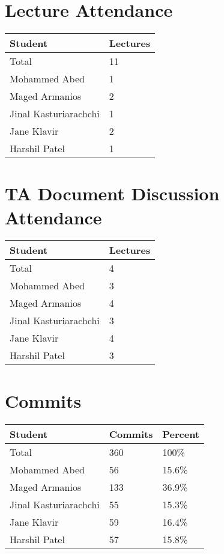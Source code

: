 \documentclass{article}
\begin{document}
\section{Lecture Attendance}

\begin{table}[H]
\centering
\begin{tabular}{ll}
\toprule
\textbf{Student} & \textbf{Lectures}\\
\midrule
Total & 11\\
Mohammed Abed & 1\\
Maged Armanios & 2\\
Jinal Kasturiarachchi & 1\\
Jane Klavir & 2\\
Harshil Patel & 1\\
\bottomrule
\end{tabular}
\end{table}


\section{TA Document Discussion Attendance}

\begin{table}[H]
\centering
\begin{tabular}{ll}
\toprule
\textbf{Student} & \textbf{Lectures}\\
\midrule
Total & 4\\
Mohammed Abed & 3\\
Maged Armanios & 4\\
Jinal Kasturiarachchi & 3\\
Jane Klavir & 4\\
Harshil Patel & 3\\
\bottomrule
\end{tabular}
\end{table}

\section{Commits}

\begin{table}[H]
\centering
\begin{tabular}{lll}
\toprule
\textbf{Student} & \textbf{Commits} & \textbf{Percent}\\
\midrule
Total & 360 & 100\% \\
Mohammed Abed & 56 & 15.6\% \\
Maged Armanios & 133 & 36.9\% \\
Jinal Kasturiarachchi & 55 & 15.3\% \\
Jane Klavir & 59 & 16.4\% \\
Harshil Patel & 57 & 15.8\% \\
\bottomrule
\end{tabular}
\end{table}
\end{document}
